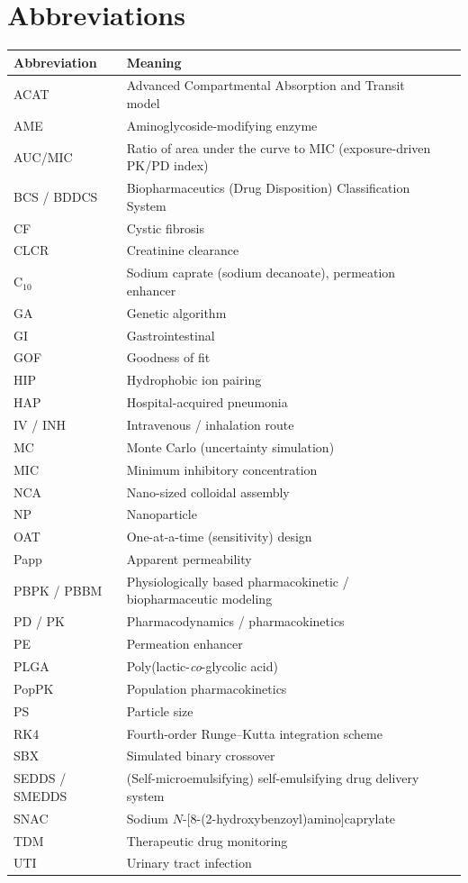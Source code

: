 \section*{Abbreviations}
\begin{table}[H]
\centering
\small
\begin{tabular}{llp{8.5cm}}
\toprule
Abbreviation & Meaning\\
\midrule
ACAT & Advanced Compartmental Absorption and Transit model\\
AME & Aminoglycoside-modifying enzyme\\
AUC/MIC & Ratio of area under the curve to MIC (exposure-driven PK/PD index)\\
BCS / BDDCS & Biopharmaceutics (Drug Disposition) Classification System\\
CF & Cystic fibrosis\\
CLCR & Creatinine clearance\\
C$_{10}$ & Sodium caprate (sodium decanoate), permeation enhancer\\
GA & Genetic algorithm\\
GI & Gastrointestinal\\
GOF & Goodness of fit\\
HIP & Hydrophobic ion pairing\\
HAP & Hospital-acquired pneumonia\\
IV / INH & Intravenous / inhalation route\\
MC & Monte Carlo (uncertainty simulation)\\
MIC & Minimum inhibitory concentration\\
NCA & Nano-sized colloidal assembly\\
NP & Nanoparticle\\
OAT & One-at-a-time (sensitivity) design\\
Papp & Apparent permeability\\
PBPK / PBBM & Physiologically based pharmacokinetic / biopharmaceutic modeling\\
PD / PK & Pharmacodynamics / pharmacokinetics\\
PE & Permeation enhancer\\
PLGA & Poly(lactic-\textit{co}-glycolic acid)\\
PopPK & Population pharmacokinetics\\
PS & Particle size\\
RK4 & Fourth-order Runge--Kutta integration scheme\\
SBX & Simulated binary crossover\\
SEDDS / SMEDDS & (Self-microemulsifying) self-emulsifying drug delivery system\\
SNAC & Sodium $N$-[8-(2-hydroxybenzoyl)amino]caprylate\\
TDM & Therapeutic drug monitoring\\
UTI & Urinary tract infection\\
\bottomrule
\end{tabular}
\end{table}
